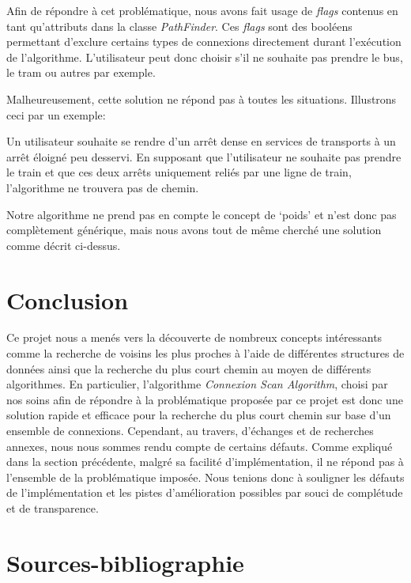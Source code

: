 \documentclass[12pt]{article}
\begin{document}
Afin de répondre à cet problématique, nous avons fait usage de \emph{flags} contenus en tant qu'attributs dans la classe \emph{PathFinder}. Ces \emph{flags} sont des booléens permettant
d'exclure certains types de connexions directement durant l'exécution de l'algorithme. L'utilisateur peut donc choisir s'il ne souhaite pas prendre le bus, le tram ou autres par exemple.

Malheureusement, cette solution ne répond pas à toutes les situations. Illustrons ceci par un exemple:

Un utilisateur souhaite se rendre d'un arrêt dense en services de transports à un arrêt éloigné peu desservi. En supposant que l'utilisateur ne souhaite pas prendre le train et 
que ces deux arrêts uniquement reliés par une ligne de train, l'algorithme ne trouvera pas de chemin.

Notre algorithme ne prend pas en compte le concept de `poids' et n'est donc pas complètement générique, mais nous avons tout de même cherché une solution comme décrit ci-dessus.



\section{Conclusion}
Ce projet nous a menés vers la découverte de nombreux concepts intéressants comme la recherche de voisins les plus proches à l'aide de différentes structures de données ainsi que
la recherche du plus court chemin au moyen de différents algorithmes. En particulier, l'algorithme \emph{Connexion Scan Algorithm}, choisi par nos soins afin de répondre à la
problématique proposée par ce projet est donc une solution rapide et efficace pour la recherche du plus court chemin sur base d'un ensemble de connexions. Cependant, au travers, d'échanges
et de recherches annexes, nous nous sommes rendu compte de certains défauts. Comme expliqué dans la section précédente, malgré sa facilité d'implémentation, il ne répond 
pas à l'ensemble de la problématique imposée. Nous tenions donc à souligner les défauts de  l'implémentation et les pistes d'amélioration possibles par souci de complétude et de transparence.


\section{Sources-bibliographie}
\printbibliography
\end{document}
